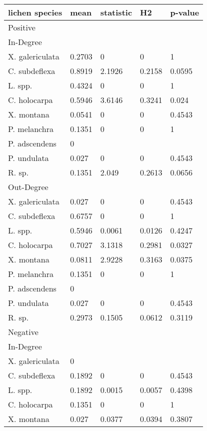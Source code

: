 \begin{table}[ht]
\centering
\begin{tabular}{lllll}
  \hline
lichen species & mean & statistic & H2 & p-value \\ 
  \hline
Positive &  &  &  &  \\ 
  In-Degree &  &  &  &  \\ 
  X. galericulata & 0.2703 & 0 & 0 & 1 \\ 
  C. subdeflexa & 0.8919 & 2.1926 & 0.2158 & 0.0595 \\ 
  L. spp. & 0.4324 & 0 & 0 & 1 \\ 
  C. holocarpa & 0.5946 & 3.6146 & 0.3241 & 0.024 \\ 
  X. montana & 0.0541 & 0 & 0 & 0.4543 \\ 
  P. melanchra & 0.1351 & 0 & 0 & 1 \\ 
  P. adscendens & 0 &  &  &  \\ 
  P. undulata & 0.027 & 0 & 0 & 0.4543 \\ 
  R. sp. & 0.1351 & 2.049 & 0.2613 & 0.0656 \\ 
  Out-Degree &  &  &  &  \\ 
  X. galericulata & 0.027 & 0 & 0 & 0.4543 \\ 
  C. subdeflexa & 0.6757 & 0 & 0 & 1 \\ 
  L. spp. & 0.5946 & 0.0061 & 0.0126 & 0.4247 \\ 
  C. holocarpa & 0.7027 & 3.1318 & 0.2981 & 0.0327 \\ 
  X. montana & 0.0811 & 2.9228 & 0.3163 & 0.0375 \\ 
  P. melanchra & 0.1351 & 0 & 0 & 1 \\ 
  P. adscendens & 0 &  &  &  \\ 
  P. undulata & 0.027 & 0 & 0 & 0.4543 \\ 
  R. sp. & 0.2973 & 0.1505 & 0.0612 & 0.3119 \\ 
  Negative &  &  &  &  \\ 
  In-Degree &  &  &  &  \\ 
  X. galericulata & 0 &  &  &  \\ 
  C. subdeflexa & 0.1892 & 0 & 0 & 0.4543 \\ 
  L. spp. & 0.1892 & 0.0015 & 0.0057 & 0.4398 \\ 
  C. holocarpa & 0.1351 & 0 & 0 & 1 \\ 
  X. montana & 0.027 & 0.0377 & 0.0394 & 0.3807 \\ 

\end{tabular}
\end{table}
